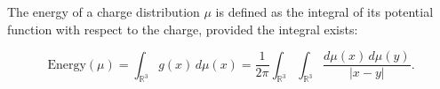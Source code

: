 The energy of a charge distribution $\mu$ is defined as the integral of its potential function with respect to the charge, provided the integral exists:

$$\text{Energy}(\mu) = \int_{\mathbb{R}^3} g(x) \, d\mu(x) = \frac{1}{2\pi} \int_{\mathbb{R}^3} \int_{\mathbb{R}^3} \frac{d\mu(x) \, d\mu(y)}{|x - y|}.$$
